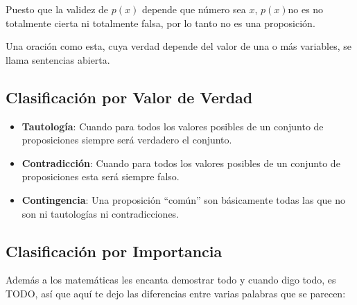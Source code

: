 \documentclass[12pt, fleqn]{report}                             %
\begin{document}
                Puesto que la validez de $p(x)$ depende que número sea $x$, $p(x)$no es no
                totalmente cierta ni totalmente falsa, por lo tanto no es una proposición.

                Una oración como esta, cuya verdad depende del valor de una o más variables,
                se llama sentencias abierta.



            \subsection{Clasificación por Valor de Verdad}

                \begin{itemize}
                    \item \textbf{Tautología}: Cuando para todos los valores posibles de un conjunto
                            de proposiciones siempre será verdadero el conjunto.

                    \item \textbf{Contradicción}: Cuando para todos los valores posibles de un conjunto
                    de proposiciones esta será siempre falso.

                    \item \textbf{Contingencia}: Una proposición “común” son básicamente todas las que
                    no son ni tautologías ni contradicciones.
                \end{itemize}

            \subsection{Clasificación por Importancia}

                Además a los matemáticas les encanta demostrar todo y cuando digo todo, es TODO, así que
                aquí te dejo las diferencias entre varias palabras que se parecen:
\end{document}
